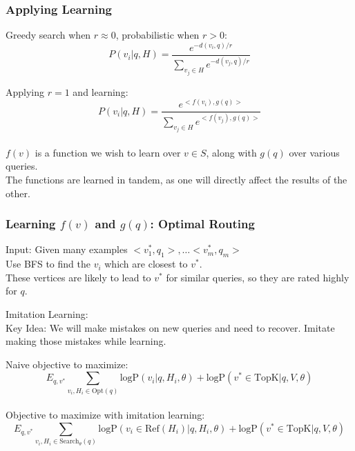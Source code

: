 \begin{frame}[t]
    \frametitle{Applying Learning}
    Greedy search when $r \approx 0$, probabilistic when $r>0$:
    \[P(v_i|q,H) = \frac{e^{-d(v_i,q)/r}}{\sum_{v_j \in H}e^{-d(v_j,q)/r}}\]

     {
    Applying $r=1$ and learning:
    \[P(v_i|q,H) = \frac{e^{<f(v_i), g(q)>}}{\sum_{v_j \in H}e^{<f(v_j),g(q)>}}\]\\
    }
     {
    \noindent $f(v)$ is a function we wish to learn over $v \in S$, along with $g(q)$ over various queries.\\
    The functions are learned in tandem, as one will directly affect the results of the other.\\
    }
\end{frame}

\begin{frame}[t]
    \frametitle{Learning $f(v)$ and $g(q)$: Optimal Routing}
    Input: Given many examples $<v_1^*, q_1>, \dots <v_m^*, q_m>$\\
    Use BFS to find the $v_i$ which are closest to $v^*$.\\
    These vertices are likely to lead to $v^*$ for similar queries, so they are rated highly for $q$.
    \vspace{0.5em}

     {
    Imitation Learning:\\
    Key Idea: We will make mistakes on new queries and need to recover. Imitate making those mistakes while learning.\\
    }
    \vspace{0.5em}

     {
        Naive objective to maximize:
        \[E_{q,v^*} \sum_{v_i,H_i\in \text{Opt}(q)} \text{logP}(v_i|q,H_i,\theta)+ \text{logP}(v^*\in \text{TopK}|q,V,\theta)\]\\
    }
     {
        Objective to maximize with imitation learning:
        \[E_{q,v^*} \sum_{v_i,H_i\in \text{Search}_\theta(q)} \text{logP}(v_i \in \text{Ref}(H_i)|q,H_i,\theta)+ \text{logP}(v^*\in \text{TopK}|q,V,\theta)\]
    }

\end{frame}


